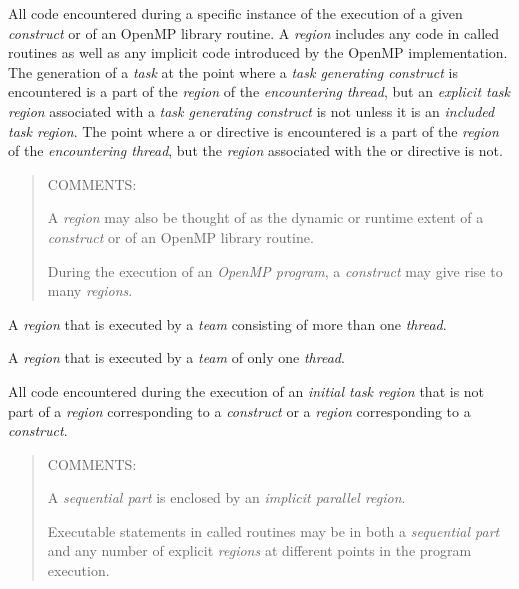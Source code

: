 \glossarydefstart
All code encountered during a specific instance of the execution of a given 
\emph{construct} or of an OpenMP library routine. A \emph{region} includes any code in called 
routines as well as any implicit code introduced by the OpenMP implementation. 
The generation of a \emph{task} at the point where a \emph{task generating construct} is encountered is a 
part of the \emph{region} of the \emph{encountering thread}, but an \emph{explicit task region}
associated with a \emph{task generating construct} is not unless it is an
\emph{included task region}. The point where a  or 
directive is encountered is a part of the \emph{region} of the \emph{encountering thread}, but the 
\emph{region} associated with the  or  directive is not.

\begin{quote}
COMMENTS:

A \emph{region} may also be thought of as the dynamic or runtime extent of a 
\emph{construct} or of an OpenMP library routine.

During the execution of an \emph{OpenMP program}, a \emph{construct} may give 
rise to many \emph{regions}.
\end{quote}
\glossarydefend

\glossarydefstart
A  \emph{region} that is executed by a \emph{team} consisting of more than one 
\emph{thread}.
\glossarydefend

\smallskip
{}
\glossarydefstart
A  \emph{region} that is executed by a \emph{team} of only one \emph{thread}.
\glossarydefend

\glossarydefstart
All code encountered during the execution of an \emph{initial task region} that is not part 
of a  \emph{region} corresponding to a  \emph{construct} or a 
\emph{region} corresponding to a  \emph{construct}.

\begin{quote}
COMMENTS: 

A \emph{sequential part} is enclosed by an \emph{implicit parallel region}.

Executable statements in called routines may be in both a \emph{sequential 
part} and any number of explicit  \emph{regions} at different points 
in the program execution.
\end{quote}
\glossarydefend

